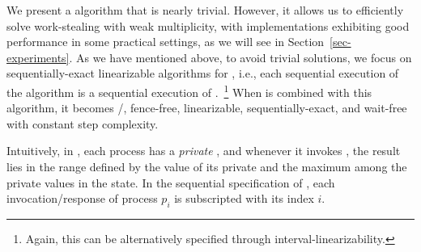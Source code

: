 We present a \RangeMaxReg algorithm that is nearly trivial. However, it allows us to efficiently solve work-stealing with weak multiplicity, with implementations exhibiting good performance in some practical settings, as we will see in Section~\ref{sec-experiments}. As we have mentioned above, to avoid trivial solutions, we focus on sequentially-exact linearizable algorithms for \RangeMaxReg, i.e., each sequential execution of the algorithm is a sequential execution of \MaxReg.~\footnote{Again, this can be alternatively specified through interval-linearizability.}  When \NCWSM is combined with this algorithm, it becomes \R/\W, fence-free, linearizable, sequentially-exact, and wait-free with constant step complexity.

Intuitively, in \RangeMaxReg, each process has a \emph{private} \MaxReg, and whenever it invokes \RMaxR, the result lies in the range defined by the value of its private \MaxReg and the maximum among the private {\MaxReg} values in the state. In the sequential specification of \RangeMaxReg, each invocation/response of process $p_i$ is subscripted with its index $i$.




